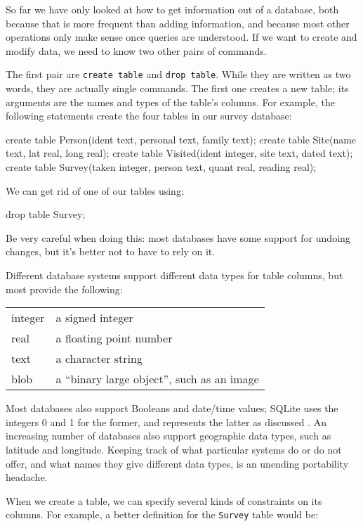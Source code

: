 So far we have only looked at how to get information out of a database,
both because that is more frequent than adding information, and because
most other operations only make sense once queries are understood. If we
want to create and modify data, we need to know two other pairs of
commands.

The first pair are \texttt{create table} and \texttt{drop table}. While
they are written as two words, they are actually single commands. The
first one creates a new table; its arguments are the names and types of
the table's columns. For example, the following statements create the
four tables in our survey database:

\begin{VerbIn}
create table Person(ident text, personal text, family text);
create table Site(name text, lat real, long real);
create table Visited(ident integer, site text, dated text);
create table Survey(taken integer, person text, quant real, reading real);
\end{VerbIn}

We can get rid of one of our tables using:

\begin{VerbIn}
drop table Survey;
\end{VerbIn}

Be very careful when doing this: most databases have some support for
undoing changes, but it's better not to have to rely on it.

Different database systems support different data types for table
columns, but most provide the following:

\begin{tabular}{ll}
integer & a signed integer \\
real & a floating point number \\
text & a character string \\
blob & a ``binary large object'', such as an image \\
\end{tabular}

Most databases also support Booleans and date/time values; SQLite uses
the integers 0 and 1 for the former, and represents the latter as
discussed . An increasing number of databases
also support geographic data types, such as latitude and longitude.
Keeping track of what particular systems do or do not offer, and what
names they give different data types, is an unending portability
headache.

When we create a table, we can specify several kinds of constraints on
its columns. For example, a better definition for the \texttt{Survey}
table would be:

